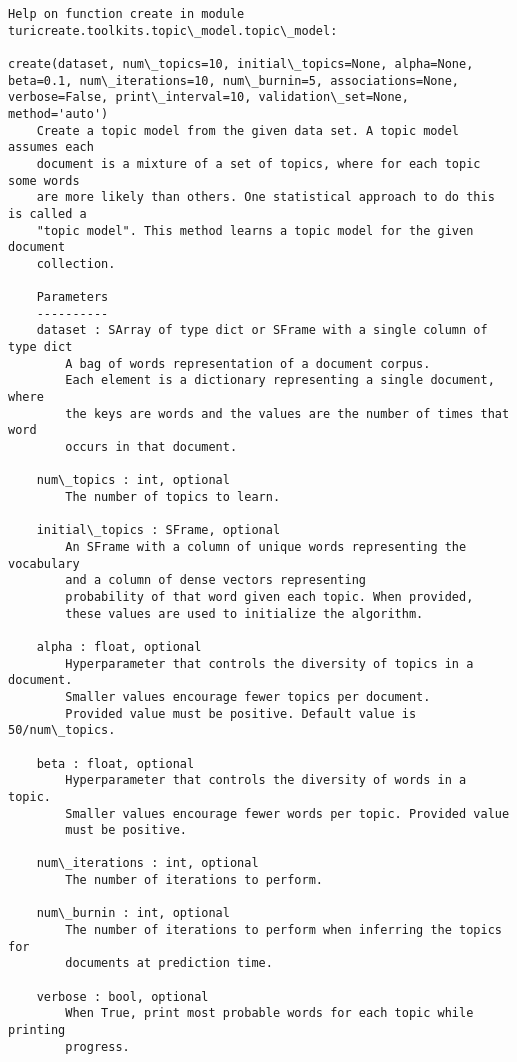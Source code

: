 \documentclass[11pt]{ctexart}
\begin{document}
    \begin{Verbatim}[commandchars=\\\{\}]
Help on function create in module turicreate.toolkits.topic\_model.topic\_model:

create(dataset, num\_topics=10, initial\_topics=None, alpha=None, beta=0.1, num\_iterations=10, num\_burnin=5, associations=None, verbose=False, print\_interval=10, validation\_set=None, method='auto')
    Create a topic model from the given data set. A topic model assumes each
    document is a mixture of a set of topics, where for each topic some words
    are more likely than others. One statistical approach to do this is called a
    "topic model". This method learns a topic model for the given document
    collection.
    
    Parameters
    ----------
    dataset : SArray of type dict or SFrame with a single column of type dict
        A bag of words representation of a document corpus.
        Each element is a dictionary representing a single document, where
        the keys are words and the values are the number of times that word
        occurs in that document.
    
    num\_topics : int, optional
        The number of topics to learn.
    
    initial\_topics : SFrame, optional
        An SFrame with a column of unique words representing the vocabulary
        and a column of dense vectors representing
        probability of that word given each topic. When provided,
        these values are used to initialize the algorithm.
    
    alpha : float, optional
        Hyperparameter that controls the diversity of topics in a document.
        Smaller values encourage fewer topics per document.
        Provided value must be positive. Default value is 50/num\_topics.
    
    beta : float, optional
        Hyperparameter that controls the diversity of words in a topic.
        Smaller values encourage fewer words per topic. Provided value
        must be positive.
    
    num\_iterations : int, optional
        The number of iterations to perform.
    
    num\_burnin : int, optional
        The number of iterations to perform when inferring the topics for
        documents at prediction time.
    
    verbose : bool, optional
        When True, print most probable words for each topic while printing
        progress.
    

\end{Verbatim}
\end{document}
